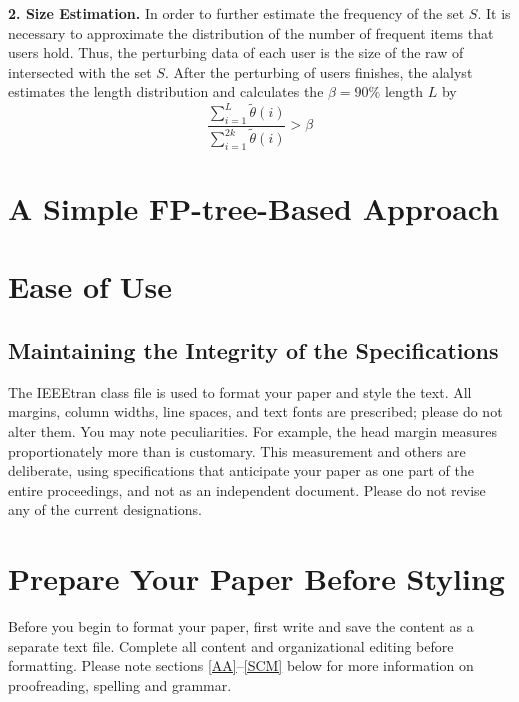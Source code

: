 \documentclass[conference]{IEEEtran}
\begin{document}
\textbf{2. Size Estimation.} In order to further estimate the frequency of the set $S$. It is necessary to approximate the distribution of the number of frequent items that users hold. Thus, the perturbing data of each user is the size of the raw of intersected with the set $S$. After the perturbing of users finishes, the alalyst estimates the length distribution and calculates the $\beta = 90\%$ length $L$ by  
\begin{equation}
\frac{\sum_{i=1}^{L} \tilde{\theta}(i)}{\sum_{i=1}^{2k} \tilde{\theta}(i)} > \beta
\end{equation}




\textbf{}

\section{A Simple FP-tree-Based Approach}

\section{Ease of Use}

\subsection{Maintaining the Integrity of the Specifications}

The IEEEtran class file is used to format your paper and style the text. All margins, 
column widths, line spaces, and text fonts are prescribed; please do not 
alter them. You may note peculiarities. For example, the head margin
measures proportionately more than is customary. This measurement 
and others are deliberate, using specifications that anticipate your paper 
as one part of the entire proceedings, and not as an independent document. 
Please do not revise any of the current designations.

\section{Prepare Your Paper Before Styling}
Before you begin to format your paper, first write and save the content as a 
separate text file. Complete all content and organizational editing before 
formatting. Please note sections \ref{AA}--\ref{SCM} below for more information on 
proofreading, spelling and grammar.
\end{document}

